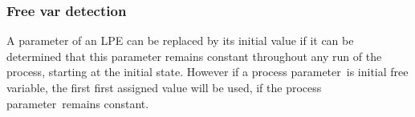 \documentclass[a4paper,10pt]{article}
\theoremstyle{plain}
\theoremstyle{definition}
\newcommand{\tool}{\textit{lpeconstelm}}
\newcommand{\pp}{process parameter}
\newcommand{\pps}{process parameters}
\begin{document}



\subsubsection{Free var detection}

A parameter of an LPE can be replaced by its initial value if it can be determined that this parameter remains constant throughout any run of the process, starting at the initial state. However if a \pp\ is initial free variable, the first first assigned value will be used, if the \pp\ remains constant.  \\
\end{document}
